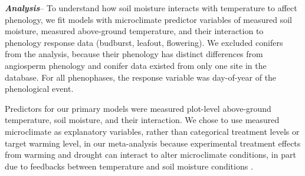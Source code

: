 \documentclass{article}
\begin{document}
\par\textbf {\emph{Analysis}}--
To understand how soil moisture interacts with temperature to affect phenology, we fit models with microclimate predictor variables of measured soil moisture, measured above-ground temperature, and their interaction to phenology response data (budburst, leafout, flowering). We excluded conifers from the analysis, because their phenology has distinct differences from angiosperm phenology \cite{polgar2014} and conifer data existed from only one site in the database. For all phenophases, the response variable was day-of-year of the phenological event. 
\par Predictors for our primary models were measured plot-level above-ground temperature, soil moisture, and their interaction. We chose to use measured microclimate as explanatory variables, rather than categorical treatment levels or target warming level, in our meta-analysis because experimental treatment effects from warming and drought can interact to alter microclimate conditions, in part due to feedbacks between temperature and soil moisture conditions \citep{ettinger2019,mcdaniel2014}.
 
\end{document}
